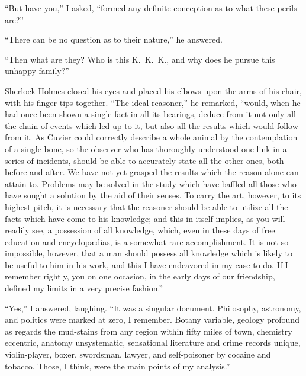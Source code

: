 “But have you,” I asked, “formed any definite conception
as to what these perils are?”

“There can be no question as to their nature,” he answered.

“Then what are they? Who is this K.\ K.\ K., and why
does he pursue this unhappy family?”

Sherlock Holmes closed his eyes and placed his elbows
upon the arms of his chair, with his finger-tips together.
“The ideal reasoner,” he remarked, “would, when he had
once been shown a single fact in all its bearings, deduce
from it not only all the chain of events which led up to it, but
also all the results which would follow from it. As Cuvier
could correctly describe a whole animal by the contemplation
of a single bone, so the observer who has thoroughly understood
one link in a series of incidents, should be able to accurately
state all the other ones, both before and after. We
have not yet grasped the results which the reason alone can
attain to. Problems may be solved in the study which have
baffled all those who have sought a solution by the aid of
their senses. To carry the art, however, to its highest pitch,
it is necessary that the reasoner should be able to utilize all
the facts which have come to his knowledge; and this in itself
implies, as you will readily see, a possession of all knowledge,
which, even in these days of free education and encyclopædias,
is a somewhat rare accomplishment. It is not so impossible,
however, that a man should possess all knowledge which is
likely to be useful to him in his work, and this I have endeavored
in my case to do. If I remember rightly, you on one
occasion, in the early days of our friendship, defined my limits
in a very precise fashion.”

“Yes,” I answered, laughing. “It was a singular document.
Philosophy, astronomy, and politics were marked at
zero, I remember. Botany variable, geology profound as regards
the mud-stains from any region within fifty miles of
town, chemistry eccentric, anatomy unsystematic, sensational
literature and crime records unique, violin-player, boxer,
swordsman, lawyer, and self-poisoner by cocaine and tobacco.
Those, I think, were the main points of my analysis.”

